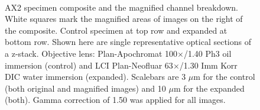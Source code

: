 \begin{figure}[h]
\hspace{0.1mm}
\hspace{0.1mm}
\\
\caption{AX2 specimen composite and the magnified channel breakdown. 
White squares mark the magnified areas of images on the right of the composite. 
Control specimen at top row and expanded at bottom row. 
Shown here are single representative optical sections of a z-stack. 
Objective lens: Plan-Apochromat 100$\times$/1.40 Ph3 oil immersion (control) and LCI Plan-Neofluar 63$\times$/1.30 Imm Korr DIC water immersion (expanded). 
Scalebars are 3 $\mu$m for the control (both original and magnified images) and 10 $\mu$m for the expanded (both). 
Gamma correction of 1.50 was applied for all images.} 
\label{fig:axexp}
\end{figure}



\renewcommand{\refname}{\spacedlowsmallcaps{References}} %

%


